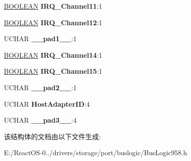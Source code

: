\begin{DoxyCompactItemize}
\mbox{\label{struct_bus_logic___configuration_a35b301412cdff8d66bc4af9e8b5916bd}} 
\hyperlink{_processor_bind_8h_a112e3146cb38b6ee95e64d85842e380a}{B\+O\+O\+L\+E\+AN} {\bfseries I\+R\+Q\+\_\+\+Channel11}\+:1
\item 
\mbox{\label{struct_bus_logic___configuration_a5d8abad80faad1e5483143d9d119607c}} 
\hyperlink{_processor_bind_8h_a112e3146cb38b6ee95e64d85842e380a}{B\+O\+O\+L\+E\+AN} {\bfseries I\+R\+Q\+\_\+\+Channel12}\+:1
\item 
\mbox{\label{struct_bus_logic___configuration_a1a3f910199e69ee28aa22964bde12132}} 
U\+C\+H\+AR {\bfseries \+\_\+\+\_\+pad1\+\_\+\+\_\+}\+:1
\item 
\mbox{\label{struct_bus_logic___configuration_a1aee53412cb3f68a0e2f620acad9f2f6}} 
\hyperlink{_processor_bind_8h_a112e3146cb38b6ee95e64d85842e380a}{B\+O\+O\+L\+E\+AN} {\bfseries I\+R\+Q\+\_\+\+Channel14}\+:1
\item 
\mbox{\label{struct_bus_logic___configuration_a61f46a449bf26021c3394f83b7891a39}} 
\hyperlink{_processor_bind_8h_a112e3146cb38b6ee95e64d85842e380a}{B\+O\+O\+L\+E\+AN} {\bfseries I\+R\+Q\+\_\+\+Channel15}\+:1
\item 
\mbox{\label{struct_bus_logic___configuration_a34e2d13915ec32f70603ce4b30c34be7}} 
U\+C\+H\+AR {\bfseries \+\_\+\+\_\+pad2\+\_\+\+\_\+}\+:1
\item 
\mbox{\label{struct_bus_logic___configuration_a0f56baca26bba74c956f341ee3ce153b}} 
U\+C\+H\+AR {\bfseries Host\+Adapter\+ID}\+:4
\item 
\mbox{\label{struct_bus_logic___configuration_af23988d39077c01a99833b096341fdfe}} 
U\+C\+H\+AR {\bfseries \+\_\+\+\_\+pad3\+\_\+\+\_\+}\+:4
\end{DoxyCompactItemize}


该结构体的文档由以下文件生成\+:\begin{DoxyCompactItemize}
\item 
E\+:/\+React\+O\+S-\/0../drivers/storage/port/buslogic/Bus\+Logic958.\+h\end{DoxyCompactItemize}

